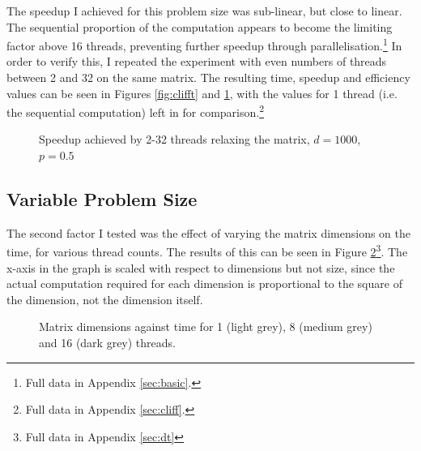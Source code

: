 \documentclass[12pt]{article}
\begin{document}
The speedup I achieved for this problem size was sub-linear, but close to linear. The sequential proportion of the computation appears to become the limiting factor above 16 threads, preventing further speedup through parallelisation.\footnote{Full data in Appendix \ref{sec:basic}.} In order to verify this, I repeated the experiment with even numbers of threads between 2 and 32 on the same matrix. The resulting time, speedup and efficiency values can be seen in Figures \ref{fig:clifft} and \ref{fig:cliffs}, with the values for 1 thread (i.e. the sequential computation) left in for comparison.\footnote{Full data in Appendix \ref{sec:cliff}.}

\begin{figure}[!htb]
    \begin{minipage}{.46\textwidth}
        \centering\caption{Time for 2-32 threads to relax the same matrix, $d=1000$, $p=0.5$}
        \label{fig:clifft}
    \end{minipage}\hspace{0.4cm}
    \begin{minipage}{0.53\textwidth}
        \centering\caption{Speedup achieved by 2-32 threads relaxing the matrix, $d=1000$, $p=0.5$}
        \label{fig:cliffs}
    \end{minipage}
\end{figure}

\subsection{Variable Problem Size}

The second factor I tested was the effect of varying the matrix dimensions on the time, for various thread counts. The results of this can be seen in Figure \ref{fig:dimension}\footnote{Full data in Appendix \ref{sec:dt}}. The x-axis in the graph is scaled with respect to dimensions but not size, since the actual computation required for each dimension is proportional to the square of the dimension, not the dimension itself.

\begin{figure}[h!]
	\centering
	\caption{Matrix dimensions against time for 1 (light grey), 8 (medium grey) and 16 (dark grey) threads.}
	\label{fig:dimension}
\end{figure}
\end{document}
